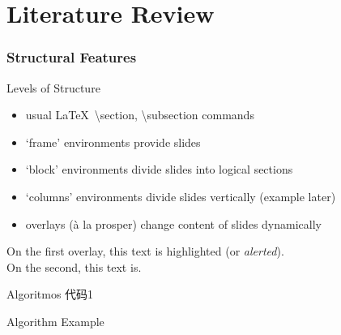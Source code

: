 \documentclass[UTF8, aspectratio=169 , 10pt，punct=kaiming]{beamer} %
\begin{document}
\section{Literature Review}

\begin{frame}
  \frametitle{Structural Features}
  \begin{block}{Levels of Structure}
    \begin{itemize}
      \item usual \LaTeX\ \textbackslash{}section, \textbackslash{}subsection commands
      \item `frame' environments provide slides
      \item `block' environments divide slides into logical sections
      \item `columns' environments divide slides vertically (example later)
      \item overlays (\`a la prosper) change content of slides dynamically
    \end{itemize}
  \end{block}
  
  \begin{example}
    On the first overlay, \alert<1>{this text} is highlighted (or \emph{alerted}).\\ On the second, \alert<2>{this text} is.
  \end{example}
\end{frame}

\begin{frame}{Algoritmos 代码1}
  \begin{algorithm}[H]
      \SetAlgoLined
      \LinesNumbered
       \caption{Algorithm Example}
  \end{algorithm}
\end{frame}
\end{document}
